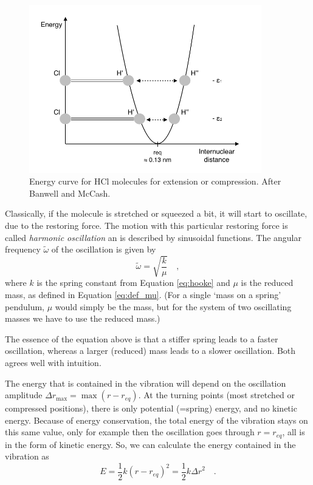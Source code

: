 \begin{figure}
\begin{center}
\includegraphics[width=0.9\textwidth]{figures/Vibration_parabol}
\caption{Energy curve for HCl molecules for extension or compression. After Banwell and McCash.}
\label{Vibration_parabol}
\end{center}
\end{figure}

Classically, if the molecule is stretched or squeezed a bit, it will
start to oscillate, due to the restoring force. The motion with this
particular restoring force is called \emph{harmonic oscillation} an is
described by sinusoidal functions. The angular frequency $\tilde{\omega}$ of the
oscillation is given by
\begin{equation}
\tilde{\omega} = \sqrt{\frac{k}{\mu}} \quad ,
\end{equation}
where $k$ is the spring constant from Equation \ref{eq:hooke} and
$\mu$ is the reduced mass, as defined in Equation
\ref{eq:def_mu}. (For a single `mass on a spring' pendulum, $\mu$
would simply be the mass, but for the system of two oscillating masses
we have to use the reduced mass.)

The essence of the equation above is that a stiffer spring leads to a
faster oscillation, whereas a larger (reduced) mass leads to a slower
oscillation. Both agrees well with intuition.

The energy that is contained in the vibration will depend on the
oscillation amplitude $\Delta r_{\mathrm{max}} = \max(r-r_{eq})$. At
the turning points (most stretched or compressed positions), there is
only potential (=spring) energy, and no kinetic energy. Because of
energy conservation, the total energy of the vibration stays on this
same value, only for example then the oscillation goes through
$r=r_{eq}$, all is in the form of kinetic energy. So, we can calculate
the energy contained in the vibration as
\begin{equation}
E = \frac{1}{2}k (r-r_{eq})^2 = \frac{1}{2} k {\Delta r}^2 \quad .
\end{equation}


